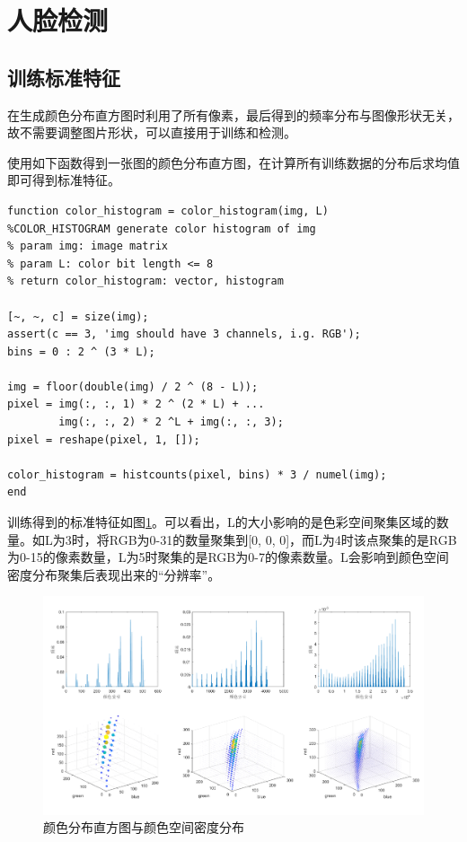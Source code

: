 \documentclass[10pt, a4paper]{article}
\begin{document}
\section{人脸检测}

\subsection{训练标准特征}

在生成颜色分布直方图时利用了所有像素，最后得到的频率分布与图像形状无关，故不需要调整图片形状，可以直接用于训练和检测。

使用如下函数得到一张图的颜色分布直方图，在计算所有训练数据的分布后求均值即可得到标准特征。

\begin{verbatim}
function color_histogram = color_histogram(img, L)
%COLOR_HISTOGRAM generate color histogram of img
% param img: image matrix
% param L: color bit length <= 8
% return color_histogram: vector, histogram

[~, ~, c] = size(img);
assert(c == 3, 'img should have 3 channels, i.g. RGB');
bins = 0 : 2 ^ (3 * L);

img = floor(double(img) / 2 ^ (8 - L));
pixel = img(:, :, 1) * 2 ^ (2 * L) + ...
        img(:, :, 2) * 2 ^L + img(:, :, 3);
pixel = reshape(pixel, 1, []);

color_histogram = histcounts(pixel, bins) * 3 / numel(img);
end
\end{verbatim}

训练得到的标准特征如图\ref{fig:exp4_1}。可以看出，L的大小影响的是色彩空间聚集区域的数量。如L为3时，将RGB为0-31的数量聚集到[0, 0, 0]，而L为4时该点聚集的是RGB为0-15的像素数量，L为5时聚集的是RGB为0-7的像素数量。L会影响到颜色空间密度分布聚集后表现出来的“分辨率”。

\begin{figure}[h]
    \centering
    \includegraphics[width=.9\textwidth]{"../assets/4_1.png"}
    \caption{颜色分布直方图与颜色空间密度分布}
    \label{fig:exp4_1}
\end{figure}
\end{document}
